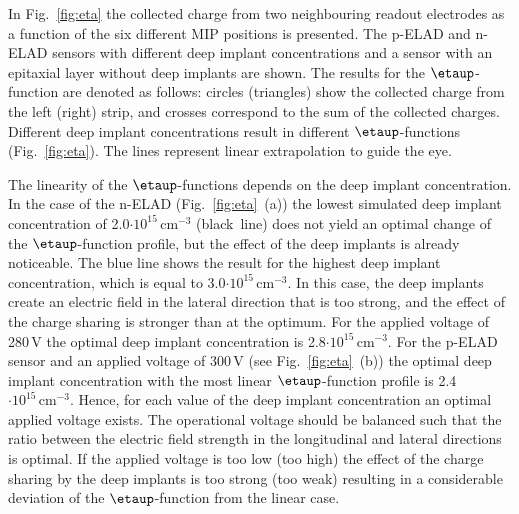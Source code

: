 \documentclass[a4paper,11pt]{article}
\begin{document}
In Fig.~\ref{fig:eta} the collected charge from two neighbouring readout electrodes as a function of the six different MIP positions is presented.
The p-ELAD and n-ELAD sensors with different deep implant concentrations and a sensor with an epitaxial layer without deep implants are shown. 
The results for the $\etaup$-function are denoted as follows: circles (triangles) show the collected charge from the left (right) strip, and crosses correspond to the sum of the collected charges. 
Different deep implant concentrations result in different $\etaup$-functions (Fig.~\ref{fig:eta}).
The lines represent linear extrapolation to guide the eye.

The linearity of the $\etaup$-functions depends on the deep implant concentration.
In the case of the n-ELAD (Fig.~\ref{fig:eta}~(a)) the lowest simulated deep implant concentration of 2.0$\mathrm{\cdot10^{15}\,cm^{-3}}$ (black~line) does not yield an optimal change of the $\etaup$-function profile, but the effect of the deep implants is already noticeable. 
The blue line shows the result for the highest deep implant concentration, which is equal to 3.0$\mathrm{\cdot10^{15}\,cm^{-3}}$. 
In this case, the deep implants create an electric field in the lateral direction that is too strong, and the effect of the charge sharing is stronger than at the optimum.
For the applied voltage of 280\,V the optimal deep implant concentration is 2.8$\mathrm{\cdot10^{15}\,cm^{-3}}$.
For the p-ELAD sensor and an applied voltage of 300\,V (see Fig.~\ref{fig:eta}~(b)) the optimal deep implant concentration with the most linear $\etaup$-function profile is 2.4$\mathrm{\cdot10^{15}\,cm^{-3}}$.
Hence, for each value of the deep implant concentration an optimal applied voltage exists. 
The operational voltage should be balanced such that the ratio between the electric field strength in the longitudinal and lateral directions is optimal. 
If the applied voltage is too low (too high) the effect of the charge sharing by the deep implants is too strong (too weak) resulting in a considerable deviation of the $\etaup$-function from the linear case.
\end{document}
